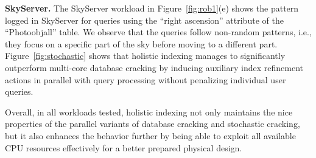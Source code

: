 \textbf{SkyServer.} 
The SkyServer workload in Figure~\ref{fig:rob1}(e) shows the pattern 
logged in SkyServer for queries using the ``right ascension'' attribute of the ``Photoobjall'' table.
We observe that the queries follow non-random patterns, i.e., they focus on a specific part of the sky before moving to a different part.
Figure~\ref{fig:stochastic} shows that holistic indexing manages to significantly outperform multi-core database cracking 
by inducing auxiliary index refinement actions in parallel with query processing without penalizing individual user queries.

Overall, in all workloads tested, holistic indexing not only maintains the nice properties of the parallel variants of database cracking and stochastic cracking, but it also enhances the behavior further by being able to exploit
all available CPU resources effectively for a better prepared physical design.

